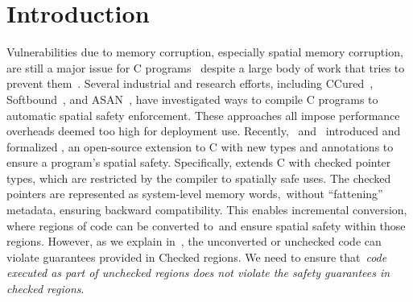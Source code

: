 \section{Introduction}\label{sec:intros}

Vulnerabilities due to memory corruption, especially spatial memory corruption, 
are still a major issue for C programs~\cite{cvetrend, microsoftmemsafe, Zeng:2013:SRF:2534766.2534798} 
despite a large body of work that tries to prevent them~\cite{song2019sanitizing}.
Several industrial and research efforts, including CCured~\cite{Necula2005},
Softbound~\cite{softbound}, and ASAN~\cite{Serebryany2012},
have investigated ways to compile C programs 
to automatic spatial safety enforcement.
These approaches all impose performance overheads deemed too high for deployment use. 
Recently,~\citet{Elliott2018} and~\citet{li22checkedc} introduced and formalized \checkedc, an
open-source extension to C with new types and
annotations to ensure a program’s spatial safety.
Specifically, \checkedc extends C with checked pointer types, which are restricted by the compiler to spatially safe uses.
The checked pointers are represented as system-level memory words,~\ie without ``fattening'' metadata, ensuring backward compatibility.
This enables incremental conversion, where regions of code can be converted to~\checkedc and ensure spatial safety within those regions.
However, as we explain in~, the unconverted or unchecked code can violate guarantees provided in Checked regions.
%
We need to ensure that~\emph{code executed as part of unchecked regions does not violate the safety guarantees in checked regions}.

